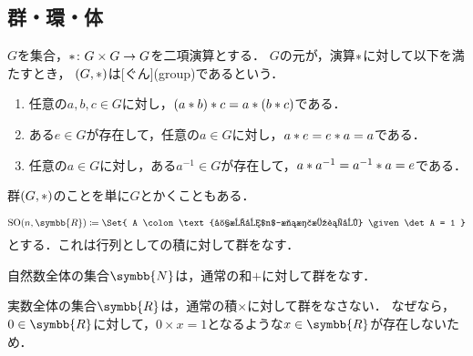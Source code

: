 \documentclass[../sotsu.tex]{subfiles}
\begin{document}
\subsection{群・環・体}

\begin{definition}[群]
    \label{dfn:group}
    $G$を集合，$\mathbin{\ast} \colon G \times G \to G$を二項演算とする．
    $G$の元が，演算$\mathbin{\ast}$に対して以下を満たすとき，
    $(G, \mathbin{\ast})$は[ぐん](group)であるという．
    \begin{enumerate}
        \item 任意の$a, b, c \in G$に対し，$(a \mathbin{\ast} b) \mathbin{\ast} c = a \mathbin{\ast} (b \mathbin{\ast} c)$である．
        \item ある$e \in G$が存在して，任意の$a \in G$に対し，$a \mathbin{\ast} e = e \mathbin{\ast} a = a$である．
        \item 任意の$a \in G$に対し，ある$a^{-1} \in G$が存在して，$a \mathbin{\ast} a^{-1} = a^{-1} \mathbin{\ast} a = e$である．
    \end{enumerate}
    群$(G, \mathbin{\ast})$のことを単に$G$とかくこともある．
\end{definition}

\begin{example}
    \begin{equation*}
        \mathrm{SO}(n, \symbb{R}) \coloneq \Set{ A \colon \text{実成分$n$-次正方行列} \given \det A = 1 }
    \end{equation*}
    とする．これは行列としての積に対して群をなす．
\end{example}

\begin{example}
    自然数全体の集合$\symbb{N}$は，通常の和$+$に対して群をなす．
\end{example}

\begin{example}
    実数全体の集合$\symbb{R}$は，通常の積$\times$に対して群をなさない．
    なぜなら，$0 \in \symbb{R}$に対して，$0 \times x = 1$となるような$x \in \symbb{R}$が存在しないため．
\end{example}
\end{document}

